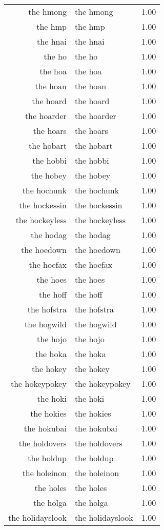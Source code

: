 \begin{table}[ht]
\begin{tabular}{rlr}
  the hmong & the hmong & 1.00 \\ 
  the hmp & the hmp & 1.00 \\ 
  the hnai & the hnai & 1.00 \\ 
  the ho & the ho & 1.00 \\ 
  the hoa & the hoa & 1.00 \\ 
  the hoan & the hoan & 1.00 \\ 
  the hoard & the hoard & 1.00 \\ 
  the hoarder & the hoarder & 1.00 \\ 
  the hoars & the hoars & 1.00 \\ 
  the hobart & the hobart & 1.00 \\ 
  the hobbi & the hobbi & 1.00 \\ 
  the hobey & the hobey & 1.00 \\ 
  the hochunk & the hochunk & 1.00 \\ 
  the hockessin & the hockessin & 1.00 \\ 
  the hockeyless & the hockeyless & 1.00 \\ 
  the hodag & the hodag & 1.00 \\ 
  the hoedown & the hoedown & 1.00 \\ 
  the hoefax & the hoefax & 1.00 \\ 
  the hoes & the hoes & 1.00 \\ 
  the hoff & the hoff & 1.00 \\ 
  the hofstra & the hofstra & 1.00 \\ 
  the hogwild & the hogwild & 1.00 \\ 
  the hojo & the hojo & 1.00 \\ 
  the hoka & the hoka & 1.00 \\ 
  the hokey & the hokey & 1.00 \\ 
  the hokeypokey & the hokeypokey & 1.00 \\ 
  the hoki & the hoki & 1.00 \\ 
  the hokies & the hokies & 1.00 \\ 
  the hokubai & the hokubai & 1.00 \\ 
  the holdovers & the holdovers & 1.00 \\ 
  the holdup & the holdup & 1.00 \\ 
  the holeinon & the holeinon & 1.00 \\ 
  the holes & the holes & 1.00 \\ 
  the holga & the holga & 1.00 \\ 
  the holidayslook & the holidayslook & 1.00 \\ 

\end{tabular}
\end{table}
